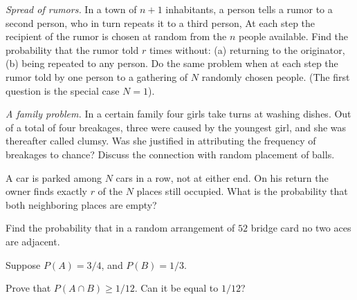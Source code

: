 \begin{problem}
  \emph{Spread of rumors.} In a town of \(n+1\) inhabitants, a person tells
  a rumor to a second person, who in turn repeats it to a third person,
  \etc{} At each step the recipient of the rumor is chosen at random from the
  \(n\) people available. Find the probability that the rumor told \(r\)
  times without: (a) returning to the originator, (b) being repeated to any
  person. Do the same problem when at each step the rumor told by one
  person to a gathering of \(N\) randomly chosen people. (The first
  question is the special case \(N=1\)).
\end{problem}
\begin{solution}

\end{solution}
\newpage

\begin{problem}
  \emph{A family problem.} In a certain family four girls take turns at
  washing dishes. Out of a total of four breakages, three were caused by
  the youngest girl, and she was thereafter called clumsy. Was she
  justified in attributing the frequency of breakages to chance? Discuss
  the connection with random placement of balls.
\end{problem}
\begin{solution}

\end{solution}
\newpage

\begin{problem}
  A car is parked among \(N\) cars in a row, not at either end. On his
  return the owner finds exactly \(r\) of the \(N\) places still
  occupied. What is the probability that both neighboring places are empty?
\end{problem}
\begin{solution}

\end{solution}
\newpage

\begin{problem}
  Find the probability that in a random arrangement of \(52\) bridge card
  no two aces are adjacent.
\end{problem}
\begin{solution}

\end{solution}
\newpage

\begin{problem}
  Suppose \(P(A)=3/4\), and \(P(B)=1/3\).

  Prove that \(P(A\cap B)\geq 1/12\). Can it be equal to \(1/12\)?
\end{problem}
\begin{solution}

\end{solution}
\newpage

